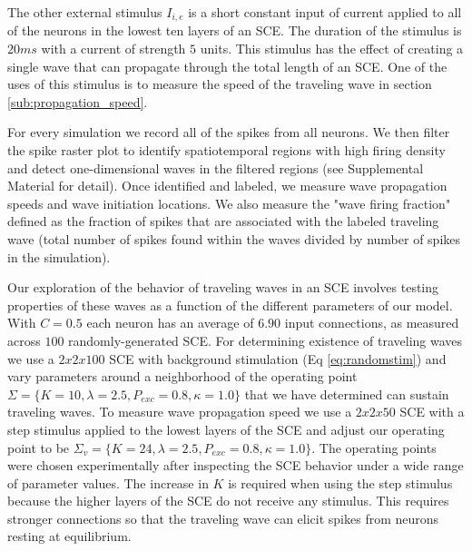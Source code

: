 \documentclass[12pt]{article}
\begin{document}
The other external stimulus $I_{i,e}$ is a short constant input of current applied to all of the neurons in the lowest ten layers of an SCE. 
The duration of the stimulus is $20 ms$ with a current of strength $5$ units. 
This stimulus has the effect of creating a single wave that can propagate through the total length of an SCE.
One of the uses of this stimulus is to measure the speed of the traveling wave in section \ref{sub:propagation_speed}.

For every simulation we record all of the spikes from all neurons. 
\color{red}We then filter the spike raster plot to identify spatiotemporal regions with high firing density and detect one-dimensional waves in the filtered regions (see Supplemental Material for detail).\color{black} 
Once identified and labeled, we measure wave propagation speeds and wave initiation locations. 
We also measure the "wave firing fraction" defined as the fraction of spikes that are associated with the labeled traveling wave (total number of spikes found within the waves divided by number of spikes in the simulation). 

Our exploration of the behavior of traveling waves in an SCE involves testing properties of these waves as a function of the different parameters of our model.
\color{red}With $C=0.5$ each neuron has an average of $6.90$ input connections, as measured across $100$ randomly-generated SCE\color{black}. 
For determining existence of traveling waves we use a \color{red}$2x2x100$ SCE\color{black} with background stimulation (Eq \ref{eq:randomstim}) and vary parameters around a neighborhood of the operating point $\Sigma = \{K=10,\lambda=2.5,P_{exc}=0.8,\kappa=1.0 \}$ that we have determined can sustain traveling waves.
\color{red}To measure wave propagation speed we use a $2x2x50$ SCE with\color{black} a step stimulus applied to the lowest layers of the SCE and adjust our operating point to be $\Sigma_v = \{K=24,\lambda=2.5,P_{exc}=0.8,\kappa=1.0 \}$.
\color{red}The operating points were chosen experimentally after inspecting the SCE behavior under a wide range of parameter values\color{black}.
The increase in $K$ is required when using the step stimulus because the higher layers of the SCE do not receive any stimulus.
This requires stronger connections so that the traveling wave can elicit spikes from neurons resting at equilibrium.
\FloatBarrier
\end{document}
